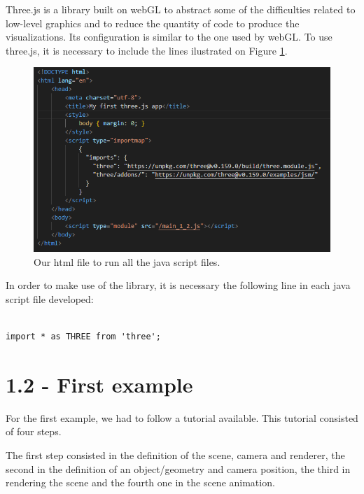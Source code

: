 \documentclass[12pt]{article}
\begin{document}
Three.js is a library built on webGL to abstract some of the difficulties related to low-level graphics and to reduce the quantity of code to produce the visualizations. Its configuration is similar to the one used by webGL. To use three.js, it is necessary to include the lines ilustrated on Figure \ref{figs:htlm_file}.

\begin{figure}[h!]
    \centering
        \includegraphics[width = \textwidth]{figs/ex11_1.png}
        \caption{Our html file to run all the java script files.}
        \label{figs:htlm_file}
\end{figure}

In order to make use of the library, it is necessary the following line in each java script file developed:
\begin{lstlisting}

import * as THREE from 'three';

\end{lstlisting}

\pagebreak

\section*{1.2 - First example}
\label{sec:ex_12}

For the first example, we had to follow a tutorial available. This tutorial consisted of four steps.\par

The first step consisted in the definition of the scene, camera and renderer, the second in the definition of an object/geometry and camera position, the third in rendering the scene and the fourth one in the scene animation.
\end{document}
